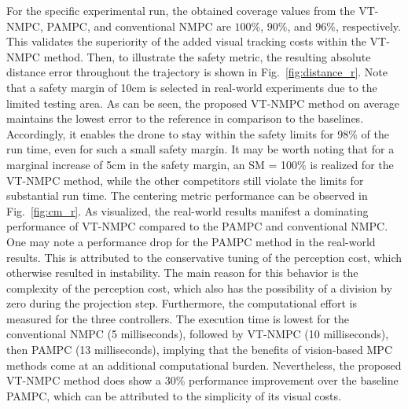 For the specific experimental run, the obtained coverage values from the VT-NMPC, PAMPC, and conventional NMPC are $100\%$, $90\%$, and $96\%$, respectively. This validates the superiority of the added visual tracking costs within the VT-NMPC method. Then, to illustrate the safety metric, the resulting absolute distance error throughout the trajectory is shown in Fig.~{\ref{fig:distance_r}}. Note that a safety margin of 10cm is selected in real-world experiments due to the limited testing area. As can be seen, the proposed VT-NMPC method on average maintains the lowest error to the reference in comparison to the baselines. Accordingly, it enables the drone to stay within the safety limits for 98\% of the run time, even for such a small safety margin. It may be worth noting that for a marginal increase of 5cm in the safety margin, an SM = 100\% is realized for the VT-NMPC method, while the other competitors still violate the limits for substantial run time. The centering metric performance can be observed in Fig.~{\ref{fig:cm_r}}. As visualized, the real-world results manifest a dominating performance of VT-NMPC compared to the PAMPC and conventional NMPC. One may note a performance drop for the PAMPC method in the real-world results. This is attributed to the conservative tuning of the perception cost, which otherwise resulted in instability. The main reason for this behavior is the complexity of the perception cost, which also has the possibility of a division by zero during the projection step. Furthermore, the computational effort is measured for the three controllers. The execution time is lowest for the conventional NMPC (5 milliseconds), followed by VT-NMPC (10 milliseconds), then PAMPC (13 milliseconds), implying that the benefits of vision-based MPC methods come at an additional computational burden. Nevertheless, the proposed VT-NMPC method does show a 30\% performance improvement over the baseline PAMPC, which can be attributed to the simplicity of its visual costs. 












